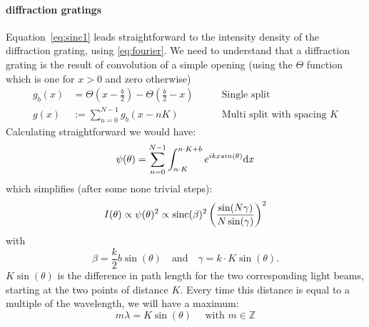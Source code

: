 \paragraph{diffraction gratings} 
Equation~\eqref{eq:sinc1} leads straightforward to the intensity density of
the diffraction grating, using \eqref{eq:fourier}. We need to understand 
that a diffraction grating is the result of convolution of a simple opening
(using the $\Theta$ function which is one for $x>0$ and zero otherwise)
\begin{align}
    \label{eq:multisplit}
    g_b(x) &= \Theta(x - \frac{b}{2}) - \Theta( \frac{b}{2} - x ) \qquad
           &\text{Single split} \\ 
   g(x)   &:= \sum_{n=0}^{N-1} g_b(x-nK) 
         \qquad &\text{Multi split with spacing } K
\end{align}
Calculating straightforward we would have:
\begin{equation}
    \psi(\theta) = \sum_{n = 0}^{N-1}  \int^{n \cdot K + b}_{n \cdot K} e^{i k x sin(\theta)} \mathrm{d} x
\end{equation}
which simplifies (after some none trivial steps):
\begin{equation}
    I(\theta) \propto \psi(\theta)^2 \propto \mathrm{sinc}(\beta)^2 \left (\frac{\sin(N\gamma)}{N \sin(\gamma)}\right )^2
\end{equation}
with
\begin{equation}
    \beta = \frac{k}{2}b \sin(\theta) \quad \text{and} \quad \gamma = k\cdot K \sin(\theta).
\end{equation}
$K \sin (\theta)$ is the difference in path length for the two corresponding light beams, 
starting at the two points of distance $K$. Every time
this distance is equal to a multiple of the wavelength, we will have a maximum:
\begin{equation}
    m \lambda = K \sin(\theta) \quad \text{ with }m \in \mathbb{Z}
    \label{eq:N_lines_interference}
\end{equation}

